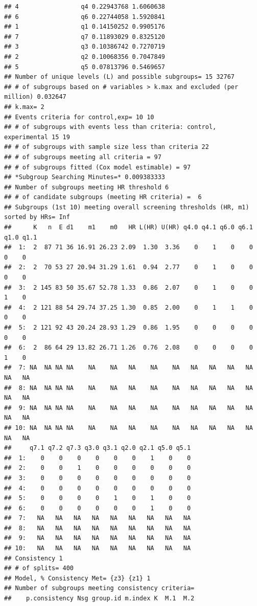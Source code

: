 \documentclass[smallextended]{svjour3}
\makeatletter
\newenvironment{kframe}{%
 \def\at@end@of@kframe{}%
 \ifinner\ifhmode%
  \def\at@end@of@kframe{\end{minipage}}%
  \begin{minipage}{\columnwidth}%
 \fi\fi%
 \def\FrameCommand##1{\hskip\@totalleftmargin \hskip-\fboxsep
 \colorbox{shadecolor}{##1}\hskip-\fboxsep
     \hskip-\linewidth \hskip-\@totalleftmargin \hskip\columnwidth}%
 \MakeFramed {\advance\hsize-\width
   \@totalleftmargin\z@ \linewidth\hsize
   \@setminipage}}%
 {\par\unskip\endMakeFramed%
 \at@end@of@kframe}
\newenvironment{knitrout}{}{} %
\makeatother
\begin{document}
\begin{knitrout}
\begin{kframe}
\begin{verbatim}
## 4                 q4 0.22943768 1.6060638
## 6                 q6 0.22744058 1.5920841
## 1                 q1 0.14150252 0.9905176
## 7                 q7 0.11893029 0.8325120
## 3                 q3 0.10386742 0.7270719
## 2                 q2 0.10068356 0.7047849
## 5                 q5 0.07813796 0.5469657
## Number of unique levels (L) and possible subgroups= 15 32767 
## # of subgroups based on # variables > k.max and excluded (per million) 0.032647 
## k.max= 2 
## Events criteria for control,exp= 10 10 
## # of subgroups with events less than criteria: control, experimental 15 19 
## # of subgroups with sample size less than criteria 22 
## # of subgroups meeting all criteria = 97 
## # of subgroups fitted (Cox model estimable) = 97 
## *Subgroup Searching Minutes=* 0.009383333 
## Number of subgroups meeting HR threshold 6 
## # of candidate subgroups (meeting HR criteria) =  6 
## Subgroups (1st 10) meeting overall screening thresholds (HR, m1) sorted by HRs= Inf 
##      K   n  E d1    m1    m0   HR L(HR) U(HR) q4.0 q4.1 q6.0 q6.1 q1.0 q1.1
##  1:  2  87 71 36 16.91 26.23 2.09  1.30  3.36    0    1    0    0    0    0
##  2:  2  70 53 27 20.94 31.29 1.61  0.94  2.77    0    1    0    0    0    0
##  3:  2 145 83 50 35.67 52.78 1.33  0.86  2.07    0    1    0    0    1    0
##  4:  2 121 88 54 29.74 37.25 1.30  0.85  2.00    0    1    1    0    0    0
##  5:  2 121 92 43 20.24 28.93 1.29  0.86  1.95    0    0    0    0    0    0
##  6:  2  86 64 29 13.82 26.71 1.26  0.76  2.08    0    0    0    0    1    0
##  7: NA  NA NA NA    NA    NA   NA    NA    NA   NA   NA   NA   NA   NA   NA
##  8: NA  NA NA NA    NA    NA   NA    NA    NA   NA   NA   NA   NA   NA   NA
##  9: NA  NA NA NA    NA    NA   NA    NA    NA   NA   NA   NA   NA   NA   NA
## 10: NA  NA NA NA    NA    NA   NA    NA    NA   NA   NA   NA   NA   NA   NA
##     q7.1 q7.2 q7.3 q3.0 q3.1 q2.0 q2.1 q5.0 q5.1
##  1:    0    0    0    0    0    0    1    0    0
##  2:    0    0    1    0    0    0    0    0    0
##  3:    0    0    0    0    0    0    0    0    0
##  4:    0    0    0    0    0    0    0    0    0
##  5:    0    0    0    0    1    0    1    0    0
##  6:    0    0    0    0    0    0    1    0    0
##  7:   NA   NA   NA   NA   NA   NA   NA   NA   NA
##  8:   NA   NA   NA   NA   NA   NA   NA   NA   NA
##  9:   NA   NA   NA   NA   NA   NA   NA   NA   NA
## 10:   NA   NA   NA   NA   NA   NA   NA   NA   NA
## Consistency 1 
## # of splits= 400 
## Model, % Consistency Met= {z3} {z1} 1 
## Number of subgroups meeting consistency criteria= 
##    p.consistency Nsg group.id m.index K  M.1  M.2

\end{verbatim}
\end{kframe}
\end{knitrout}
\end{document}
